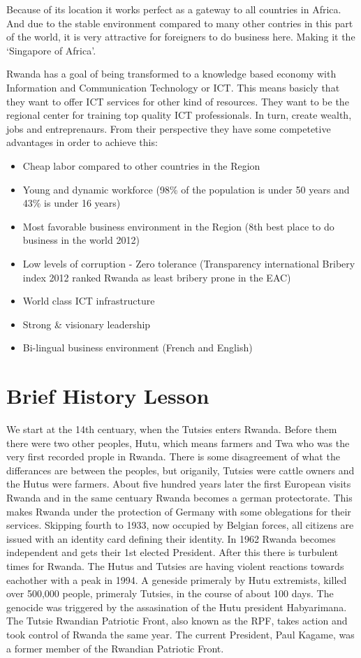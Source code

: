 Because of its location it works perfect as a gateway to all countries in Africa. 
And due to the stable environment compared to many other contries in this part of the world, it is very attractive for foreigners to do business here. 
Making it the `Singapore of Africa'.

Rwanda has a goal of being transformed to a knowledge based economy with Information and Communication Technology or ICT. 
This means basicly that they want to offer ICT services for other kind of resources. 
They want to be the regional center for training top quality ICT professionals.
In turn, create wealth, jobs and entreprenaurs. 
From their perspective they have some competetive advantages in order to achieve this:
\begin{itemize}
\item Cheap labor compared to other countries in the Region
\item Young and dynamic workforce (98\% of the population is under 50 years and 43\% is under 16 years)
\item Most favorable business environment in the Region (8th best place to do business in the world 2012)
\item Low levels of corruption - Zero tolerance (Transparency international Bribery index 2012 ranked Rwanda as least bribery prone in the EAC)
\item World class ICT infrastructure
\item Strong \& visionary leadership
\item Bi-lingual business environment (French and English)
\end{itemize}
\cite{2}

\section{Brief History Lesson}
We start at the 14th centuary, when the Tutsies enters Rwanda. 
Before them there were two other peoples, Hutu, which means farmers and Twa who was the very first recorded prople in Rwanda.
There is some disagreement of what the differances are between the peoples, but origanily, Tutsies were cattle owners and the Hutus were farmers. 
About five hundred years later the first European visits Rwanda and in the same centuary Rwanda becomes a german protectorate. 
This makes Rwanda under the protection of Germany with some oblegations for their services.
Skipping fourth to 1933, now occupied by Belgian forces, all citizens are issued with an identity card defining their identity.
In 1962 Rwanda becomes independent and gets their 1st elected President. 
After this there is turbulent times for Rwanda. The Hutus and Tutsies are having violent reactions towards eachother with a peak in 1994.
A geneside primeraly by Hutu extremists, killed over 500,000 people, primeraly Tutsies, in the course of about 100 days. 
The genocide was triggered by the assasination of the Hutu president Habyarimana.  
The Tutsie Rwandian Patriotic Front, also known as the RPF, takes action and took control of Rwanda the same year.
The current President, Paul Kagame, was a former member of the Rwandian Patriotic Front.
\cite{17}\cite{18}\cite{19}

